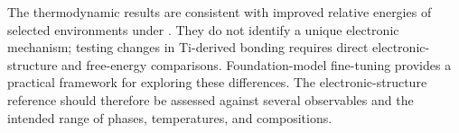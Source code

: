 The thermodynamic results are consistent with improved relative energies of selected environments under \rscan{}.
They do not identify a unique electronic mechanism; testing changes in Ti-derived bonding requires direct electronic-structure and free-energy comparisons.
Foundation-model fine-tuning provides a practical framework for exploring these differences.
The electronic-structure reference should therefore be assessed against several observables and the intended range of phases, temperatures, and compositions.
